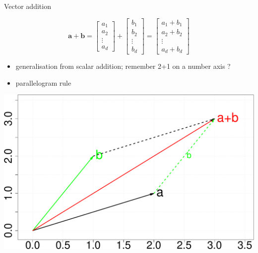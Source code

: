 \documentclass[ignorenonframetext,]{beamer}
\providecommand{\tightlist}{%
  \setlength{\itemsep}{0pt}\setlength{\parskip}{0pt}}
\newcommand{\vv}[1]{\boldsymbol{#1}}
\begin{document}
\begin{frame}{Vector addition}
\protect\hypertarget{vector-addition}{}

\[\vv{a}+\vv{b} = \begin{bmatrix}
           a_1 \\
           a_2 \\
           \vdots\\
           a_d
         \end{bmatrix} +  \begin{bmatrix}
           b_1 \\
           b_2 \\
           \vdots\\
           b_d
         \end{bmatrix} = \begin{bmatrix}
           a_1+b_1 \\
           a_2+b_2 \\
           \vdots\\
           a_d+b_d
         \end{bmatrix}\]

\begin{itemize}
\tightlist
\item
  generalisation from scalar addition; remember 2+1 on a number axis ?
\item
  parallelogram rule \bigskip
\end{itemize}

\begin{center}\includegraphics[width=0.5\linewidth]{math4ml_files/figure-beamer/unnamed-chunk-3-1} \end{center}

\end{frame}
\end{document}
